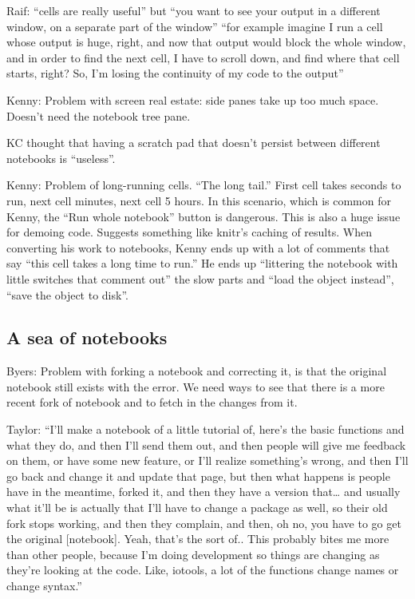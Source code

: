 Raif: ``cells are really useful'' but ``you want to see your output in a
different window, on a separate part of the window'' ``for example imagine I run
a cell whose output is huge, right, and now that output would block the whole
window, and in order to find the next cell, I have to scroll down, and find
where that cell starts, right? So, I'm losing the continuity of my code to the
output''


Kenny: Problem with screen real estate: side panes take up too much
space. Doesn't need the notebook tree pane.

KC thought that having a scratch pad that doesn't persist between different
notebooks is ``useless''.

Kenny: Problem of long-running cells.  ``The long tail.''  First cell takes
seconds to run, next cell minutes, next cell 5 hours.  In this scenario, which
is common for Kenny, the ``Run whole notebook'' button is dangerous. This is
also a huge issue for demoing code.  Suggests something like knitr's caching of
results. When converting his work to notebooks, Kenny ends up with a lot of
comments that say ``this cell takes a long time to run.'' He ends up ``littering
the notebook with little switches that comment out'' the slow parts and ``load
the object instead'', ``save the object to disk''.


\subsection{A sea of notebooks}

Byers: Problem with forking a notebook and correcting it, is that the original
notebook still exists with the error.  We need ways to see that there is a more
recent fork of notebook and to fetch in the changes from it.

Taylor: ``I'll make a notebook of a little tutorial of, here's the basic
functions and what they do, and then I'll send them out, and then people will
give me feedback on them, or have some new feature, or I'll realize something's
wrong, and then I'll go back and change it and update that page, but then what
happens is people have in the meantime, forked it, and then they have a version
that… and usually what it'll be is actually that I'll have to change a package
as well, so their old fork stops working, and then they complain, and then, oh
no, you have to go get the original [notebook]. Yeah, that's the sort of.. This
probably bites me more than other people, because I'm doing development so
things are changing as they're looking at the code. Like, iotools, a lot of the
functions change names or change syntax.''

